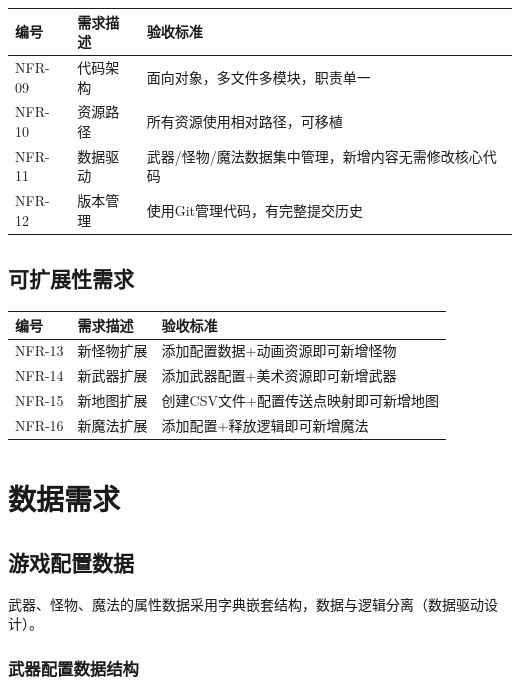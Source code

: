 \documentclass[12pt,a4paper]{article}
\begin{document}
\begin{table}[htbp]
\centering
\begin{tabularx}{\textwidth}{lXX}
\toprule
\textbf{编号} & \textbf{需求描述} & \textbf{验收标准} \\
\midrule
NFR-09 & 代码架构 & 面向对象，多文件多模块，职责单一 \\
NFR-10 & 资源路径 & 所有资源使用相对路径，可移植 \\
NFR-11 & 数据驱动 & 武器/怪物/魔法数据集中管理，新增内容无需修改核心代码 \\
NFR-12 & 版本管理 & 使用Git管理代码，有完整提交历史 \\
\bottomrule
\end{tabularx}
\end{table}

\subsection{可扩展性需求}

\begin{table}[htbp]
\centering
\begin{tabularx}{\textwidth}{lXX}
\toprule
\textbf{编号} & \textbf{需求描述} & \textbf{验收标准} \\
\midrule
NFR-13 & 新怪物扩展 & 添加配置数据+动画资源即可新增怪物 \\
NFR-14 & 新武器扩展 & 添加武器配置+美术资源即可新增武器 \\
NFR-15 & 新地图扩展 & 创建CSV文件+配置传送点映射即可新增地图 \\
NFR-16 & 新魔法扩展 & 添加配置+释放逻辑即可新增魔法 \\
\bottomrule
\end{tabularx}
\end{table}


\section{数据需求}

\subsection{游戏配置数据}

武器、怪物、魔法的属性数据采用字典嵌套结构，数据与逻辑分离（数据驱动设计）。

\subsubsection{武器配置数据结构}
\end{document}
